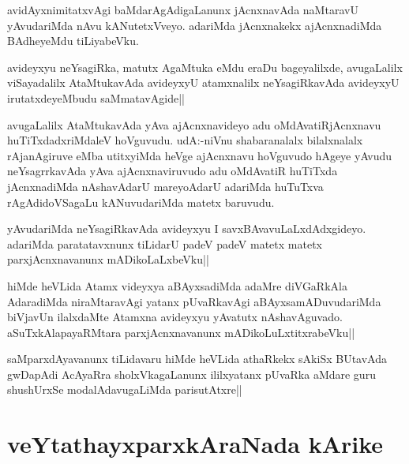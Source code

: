 \begin{artha}
avidAyxnimitatxvAgi baMdarAgAdigaLanunx jAcnxnavAda naMtaravU yAvudariMda nAvu kANutetxVveyo. adariMda jAcnxnakekx ajAcnxnadiMda BAdheyeMdu tiLiyabeVku.
\end{artha}

\begin{artha}
avideyxyu neYsagiRka, matutx AgaMtuka eMdu eraDu bageyalilxde, avugaLalilx viSayadalilx AtaMtukavAda avideyxyU atamxnalilx neYsagiRkavAda avideyxyU irutatxdeyeMbudu saMmatavAgide||
\end{artha}


\begin{artha}
avugaLalilx AtaMtukavAda yAva ajAcnxnavideyo adu oMdAvatiRjAcnxnavu huTiTxdadxriMdaleV hoVguvudu. udA:-niVnu shabaranalalx bilalxnalalx rAjanAgiruve eMba utitxyiMda heVge ajAcnxnavu hoVguvudo hAgeye yAvudu neYsagrrkavAda yAva ajAcnxnaviruvudo adu oMdAvatiR huTiTxda jAcnxnadiMda nAshavAdarU mareyoAdarU adariMda huTuTxva rAgAdidoVSagaLu kANuvudariMda matetx baruvudu.
\end{artha}


\begin{artha}
yAvudariMda neYsagiRkavAda avideyxyu I savxBAvavuLaLxdAdxgideyo. adariMda paratatavxnunx tiLidarU padeV padeV matetx matetx parxjAcnxnavanunx mADikoLaLxbeVku||
\end{artha}


\begin{artha}
hiMde heVLida Atamx videyxya aBAyxsadiMda adaMre diVGaRkAla AdaradiMda niraMtaravAgi yatanx pUvaRkavAgi aBAyxsamADuvudariMda biVjavUn ilalxdaMte Atamxna avideyxyu yAvatutx nAshavAguvado. aSuTxkAlapayaRMtara parxjAcnxnavanunx mADikoLuLxtitxrabeVku||
\end{artha}

\begin{artha}
saMparxdAyavanunx tiLidavaru hiMde heVLida athaRkekx sAkiSx BUtavAda gwDapAdi AcAyaRra sholxVkagaLanunx ililxyatanx pUvaRka aMdare guru shushUrxSe modalAdavugaLiMda parisutAtxre||
\end{artha}

\section*{veYtathayxparxkAraNada kArike}

